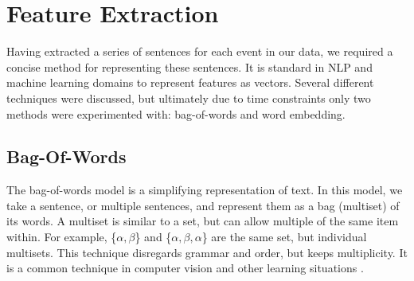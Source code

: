 \documentclass[bsc,frontabs,twoside,singlespacing,parskip,deptreport]{infthesis}     %
\begin{document}
\section{Feature Extraction}\label{sec:representation}
Having extracted a series of sentences for each event in our data, we required a concise method
for representing these sentences. It is standard in NLP and machine learning domains to represent features as vectors.
Several different techniques were discussed, but ultimately due to time constraints only two methods were
experimented with: bag-of-words and word embedding.
\subsection{Bag-Of-Words}
The bag-of-words model is a simplifying representation of text.
In this model, we take a sentence, or multiple sentences, and represent them as a bag (multiset) of its words.
A multiset is similar to a set, but can allow multiple of the same item within.
For example, \{$\alpha,\beta$\} and \{$\alpha,\beta,\alpha$\} are the same set, but individual multisets.
This technique disregards grammar and order, but keeps multiplicity. It is a common technique in computer vision
and other learning situations \cite{sivic2009efficient}.
\end{document}
